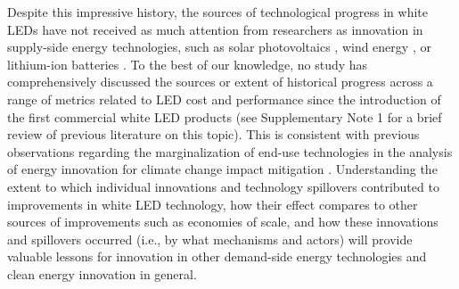 \documentclass[parskip=full]{article}
\begin{document}
Despite this impressive history, the sources of technological progress in white LEDs have not received as much attention from researchers as innovation in supply-side energy technologies, such as solar photovoltaics \cite{kavlak2018evaluating, nemet2019solar}, wind energy \cite{qiu2012price, jennings2020policy}, or lithium-ion batteries \cite{Ziegler2021, Stephan2021}. To the best of our knowledge, no study has comprehensively discussed the sources or extent of historical progress across a range of metrics related to LED cost and performance since the introduction of the first commercial white LED products (see Supplementary Note 1 for a brief review of previous literature on this topic). This is consistent with previous observations regarding the marginalization of end-use technologies in the analysis of energy innovation for climate change impact mitigation \cite{Wilson2012, Creutzig2018}. Understanding the extent to which individual innovations and technology spillovers contributed to improvements in white LED technology, how their effect compares to other sources of improvements such as economies of scale, and how these innovations and spillovers occurred (i.e., by what mechanisms and actors) will provide valuable lessons for innovation in other demand-side energy technologies and clean energy innovation in general.

\clearpage
\end{document}
